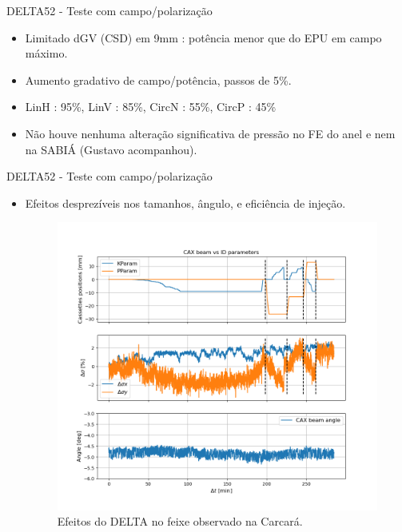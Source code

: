 \documentclass{beamer}					  %
\begin{document}
\begin{frame}{DELTA52 - Teste com campo/polarização}
    \begin{itemize}
            \item Limitado dGV (CSD) em 9mm : potência menor que do EPU em campo máximo.
            \item Aumento gradativo de campo/potência, passos de 5\%.
            \item LinH : 95\%, LinV : 85\%, CircN : 55\%, CircP : 45\%
            \item Não houve nenhuma alteração significativa de pressão no FE do anel e nem na SABIÁ (Gustavo acompanhou).
    \end{itemize}
\end{frame}

\begin{frame}{DELTA52 - Teste com campo/polarização}
    \begin{itemize}
            \item Efeitos desprezíveis nos tamanhos, ângulo, e eficiência de injeção.
            \begin{figure}[H]
    		\centering
            \includegraphics[width=.7\textwidth]{2023-11-17/figures/CAX_beam_id_param.png}
            \caption{Efeitos do DELTA no feixe observado na Carcará.}
            \label{fig:cax_param}
    \end{figure}
    \end{itemize}
\end{frame}
\end{document}
